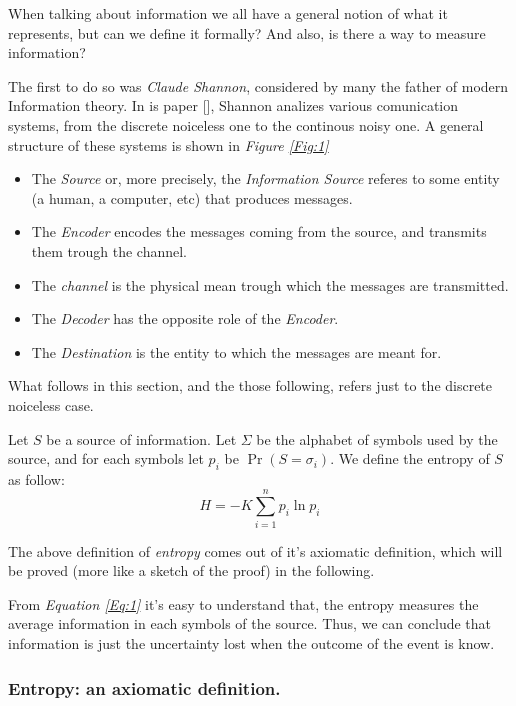 \documentclass{subfiles}
\begin{document}
    When talking about information we all have a general notion of what it represents,
        but can we define it formally? And also, is there a way to measure information?

    The first to do so was \emph{Claude Shannon}, 
        considered by many the father of modern Information theory.
    In is paper [],
    Shannon analizes various comunication systems,
    from the discrete noiceless one to the continous noisy one.
    A general structure of these systems is shown in \emph{Figure \ref{Fig:1}}
    

    \begin{itemize}
        \item The \emph{Source} or, more precisely, 
            the \emph{Information Source} referes to some entity
            (a human, a computer, etc) that produces messages.

        \item The \emph{Encoder} encodes the messages coming from the source,
            and transmits them trough the channel.

        \item The \emph{channel} is the physical mean trough which the messages
            are transmitted.

        \item The \emph{Decoder} has the opposite role of the \emph{Encoder}.
        \item The \emph{Destination} is the entity to which the messages are meant for.
    \end{itemize}

    \begin{remark*}
        What follows in this section, and the those following,
        refers just to the discrete noiceless case.
    \end{remark*}

    Let \(S\) be a source of information. 
    Let \(\Sigma\) be the alphabet of symbols used by the source,
    and for each symbols let \(p_{i}\) be \(\Pr(S = \sigma_{i})\).
    We define the entropy of \(S\) as follow:
    \begin{equation}\label{Eq:1}
        H = -K \sum_{i = 1}^{n}{p_{i} \ln p_{i}}
    \end{equation}

    The above definition of \emph{entropy} comes out of it's axiomatic definition,
    which will be proved (more like a sketch of the proof) in the following.

    From \emph{Equation \eqref{Eq:1}} it's easy to understand that,
        the entropy measures the average information in each symbols of the source.
        Thus, we can conclude that information is just the uncertainty lost 
        when the outcome of the event is know.
    
    \subsubsection{Entropy: an axiomatic definition.}
    
\end{document}
